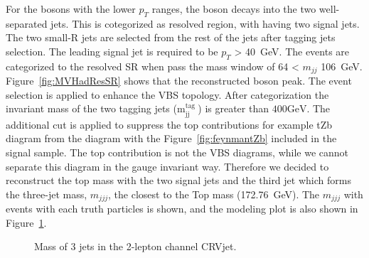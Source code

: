 For the bosons with the lower $p_T$ ranges, the boson decays into the two well-separated jets. This is cotegorized as resolved region, with having two signal jets. The two small-R jets are selected from the rest of the jets after tagging jets selection. The leading signal jet is required to be $p_T$ > 40~GeV. The events are categorized to the resolved SR when pass the mass window of 64 < $m_{jj}$ 106~GeV. Figure~\ref{fig:MVHadResSR} shows that the reconstructed boson peak.
The event selection is applied to enhance the VBS topology. After categorization the invariant mass of the two tagging jets ($\mathrm{m}_{\mathrm{jj}}^{\text {tag }}$) is greater than $400 \mathrm{GeV}$.
The additional cut is applied to suppress the top contributions for example tZb diagram from the diagram with the Figure~\ref{fig:feynmantZb} included in the signal sample. The top contribution is not the VBS diagrams, while we cannot separate this diagram in the gauge invariant way. Therefore we decided to reconstruct the top mass with the two signal jets and the third jet which forms the three-jet mass, $m_{jjj}$, the closest to the Top mass (172.76~GeV). The $m_{jjj}$ with events with each truth particles is shown, and the modeling plot is also shown in Figure~\ref{fig:2leptopMass}. 
\begin{figure}[ht]
    \begin{center}
        \caption{ Mass of 3 jets in the 2-lepton channel CRVjet.}
        \label{fig:2leptopMass}
    \end{center}
\end{figure}

